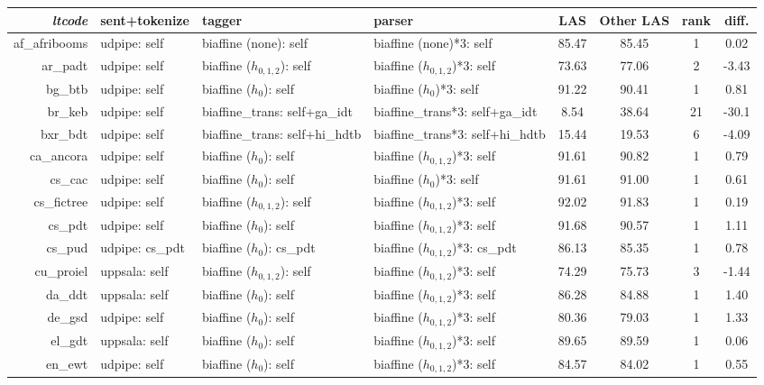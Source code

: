 \documentclass[11pt,a4paper]{article}
\begin{document}
\begin{table}[t]
	\scriptsize
	\centering
	\setlength{\tabcolsep}{4pt}
	\begin{tabular}{rlllcccc}
		\textit{ltcode} & sent+tokenize & tagger & parser & LAS & Other LAS & rank & diff. \\
		\hline
		af\_afribooms & udpipe: self & biaffine (none): self & biaffine (none)*3: self & 85.47 & 85.45 & 1 & 0.02 \\
		ar\_padt & udpipe: self & biaffine ($h_{0,1,2}$): self & biaffine ($h_{0,1,2}$)*3: self & 73.63 & 77.06 & 2 & -3.43 \\
		bg\_btb & udpipe: self & biaffine ($h_{0}$): self & biaffine ($h_{0}$)*3: self & 91.22 & 90.41 & 1 & 0.81 \\
		br\_keb & udpipe: self & biaffine\_trans: self+ga\_idt & biaffine\_trans*3: self+ga\_idt & 8.54 & 38.64 & 21 & -30.1 \\
		bxr\_bdt & udpipe: self & biaffine\_trans: self+hi\_hdtb & biaffine\_trans*3: self+hi\_hdtb & 15.44 & 19.53 & 6 & -4.09 \\
		ca\_ancora & udpipe: self & biaffine ($h_{0}$): self & biaffine ($h_{0,1,2}$)*3: self & 91.61 & 90.82 & 1 & 0.79 \\
		cs\_cac & udpipe: self & biaffine ($h_{0}$): self & biaffine ($h_{0}$)*3: self & 91.61 & 91.00 & 1 & 0.61 \\
		cs\_fictree & udpipe: self & biaffine ($h_{0,1,2}$): self & biaffine ($h_{0,1,2}$)*3: self & 92.02 & 91.83 & 1 & 0.19 \\
		cs\_pdt & udpipe: self & biaffine ($h_{0}$): self & biaffine ($h_{0,1,2}$)*3: self & 91.68 & 90.57 & 1 & 1.11 \\
		cs\_pud & udpipe: cs\_pdt & biaffine ($h_{0}$): cs\_pdt & biaffine ($h_{0,1,2}$)*3: cs\_pdt & 86.13 & 85.35 & 1 & 0.78 \\
		cu\_proiel & uppsala: self & biaffine ($h_{0,1,2}$): self & biaffine ($h_{0,1,2}$)*3: self & 74.29 & 75.73 & 3 & -1.44 \\
		da\_ddt & uppsala: self & biaffine ($h_{0}$): self & biaffine ($h_{0,1,2}$)*3: self & 86.28 & 84.88 & 1 & 1.40 \\
		de\_gsd & udpipe: self & biaffine ($h_{0}$): self & biaffine ($h_{0,1,2}$)*3: self & 80.36 & 79.03 & 1 & 1.33 \\
		el\_gdt & uppsala: self & biaffine ($h_{0}$): self & biaffine ($h_{0,1,2}$)*3: self & 89.65 & 89.59 & 1 & 0.06 \\
		en\_ewt & udpipe: self & biaffine ($h_{0}$): self & biaffine ($h_{0,1,2}$)*3: self & 84.57 & 84.02 & 1 & 0.55 \\

\end{tabular}
\end{table}
\end{document}

